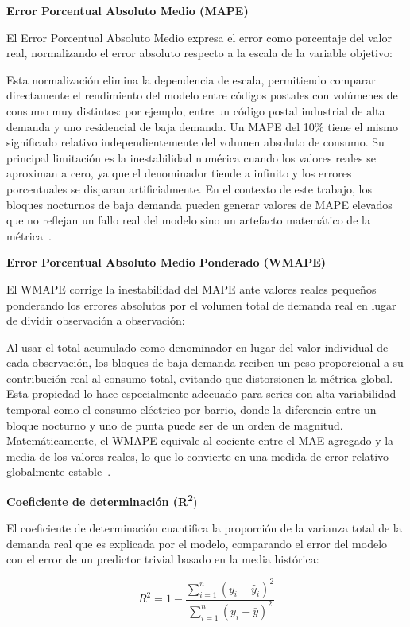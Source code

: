 \documentclass[12pt, a4paper]{article}
\begin{document}
\textbf{Error Porcentual Absoluto Medio (MAPE)}

El Error Porcentual Absoluto Medio expresa el error como porcentaje del valor real, normalizando el error absoluto respecto a la escala de la variable objetivo:

Esta normalización elimina la dependencia de escala, permitiendo comparar directamente el rendimiento del modelo entre códigos postales con volúmenes de consumo muy distintos: por ejemplo, entre un código postal industrial de alta demanda y uno residencial de baja demanda. Un MAPE del 10\% tiene el mismo significado relativo independientemente del volumen absoluto de consumo. Su principal limitación es la inestabilidad numérica cuando los valores reales se aproximan a cero, ya que el denominador tiende a infinito y los errores porcentuales se disparan artificialmente. En el contexto de este trabajo, los bloques nocturnos de baja demanda pueden generar valores de MAPE elevados que no reflejan un fallo real del modelo sino un artefacto matemático de la métrica~\cite{gassar2024, rubattu2023}.

\textbf{Error Porcentual Absoluto Medio Ponderado (WMAPE)}

El WMAPE corrige la inestabilidad del MAPE ante valores reales pequeños ponderando los errores absolutos por el volumen total de demanda real en lugar de dividir observación a observación:

Al usar el total acumulado como denominador en lugar del valor individual de cada observación, los bloques de baja demanda reciben un peso proporcional a su contribución real al consumo total, evitando que distorsionen la métrica global. Esta propiedad lo hace especialmente adecuado para series con alta variabilidad temporal como el consumo eléctrico por barrio, donde la diferencia entre un bloque nocturno y uno de punta puede ser de un orden de magnitud. Matemáticamente, el WMAPE equivale al cociente entre el MAE agregado y la media de los valores reales, lo que lo convierte en una medida de error relativo globalmente estable~\cite{gassar2024, rubattu2023}.

\textbf{Coeficiente de determinación (R\textsuperscript{2}})

El coeficiente de determinación cuantifica la proporción de la varianza total de la demanda real que es explicada por el modelo, comparando el error del modelo con el error de un predictor trivial basado en la media histórica:

\begin{equation}
R^2 = 1 - \frac{\sum_{i=1}^{n}(y_i - \hat{y}_i)^2}{\sum_{i=1}^{n}(y_i - \bar{y})^2}
\end{equation}
\end{document}
